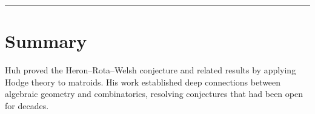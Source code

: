 \begin{center}\rule{0.5\linewidth}{0.5pt}\end{center}

\section*{Summary}

Huh proved the Heron--Rota--Welsh conjecture and related results by applying Hodge theory to matroids. His work established deep connections between algebraic geometry and combinatorics, resolving conjectures that had been open for decades.
